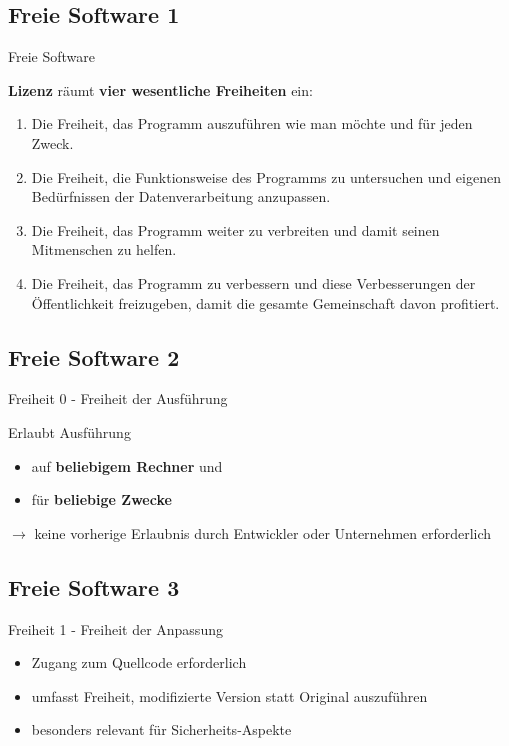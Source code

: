 \documentclass[12pt]{beamer}
\begin{document}
\subsection{Freie Software 1}
\begin{frame}{Freie Software}


\textbf{Lizenz} räumt \textbf{vier wesentliche Freiheiten} ein:
\begin{enumerate}
\item[0] Die Freiheit, das Programm auszuführen wie man möchte und für jeden
Zweck.
\item[1] Die Freiheit, die Funktionsweise des Programms zu untersuchen und
eigenen Bedürfnissen der Datenverarbeitung anzupassen.
\item[2] Die Freiheit, das Programm weiter zu verbreiten und damit seinen
Mitmenschen zu helfen.
\item[3] Die Freiheit, das Programm zu verbessern und diese Verbesserungen
der Öffentlichkeit freizugeben, damit die gesamte Gemeinschaft davon
profitiert.
\end{enumerate}
\end{frame}



\subsection{Freie Software 2}
\begin{frame}{Freiheit 0 - Freiheit der Ausführung}


Erlaubt Ausführung
\begin{itemize}
\item auf \textbf{beliebigem Rechner} und
\item für \textbf{beliebige Zwecke}
\end{itemize}

$\rightarrow$ keine vorherige Erlaubnis durch Entwickler oder Unternehmen
erforderlich 

\end{frame}



\subsection{Freie Software 3}
\begin{frame}{Freiheit 1 - Freiheit der Anpassung}

\begin{itemize}
\item Zugang zum Quellcode erforderlich
\item umfasst Freiheit, modifizierte Version statt Original auszuführen
\item besonders relevant für Sicherheits-Aspekte
\end{itemize}
\end{frame}
\end{document}
